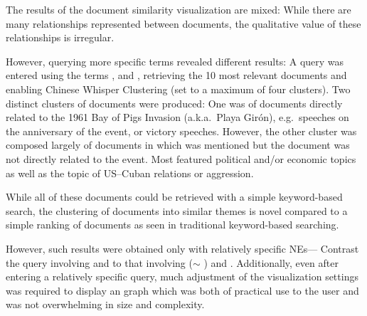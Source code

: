 The results of the document similarity visualization are mixed: While there are many relationships represented between documents, the qualitative value of these relationships is irregular.

However, querying more specific terms revealed different results: A query was entered using the terms , and , retrieving the 10 most relevant documents and enabling Chinese Whisper Clustering (set to a maximum of four clusters). Two distinct clusters of documents were produced: One was of documents directly related to the 1961 Bay of Pigs Invasion (a.k.a.\ Playa Gir\'{o}n), e.g.\ speeches on the anniversary of the event, or victory speeches. However, the other cluster was composed largely of documents in which  was mentioned but the document was not directly related to the event. Most featured political and/or economic topics as well as the topic of US--Cuban relations or aggression.

While all of these documents could be retrieved with a simple keyword-based search, the clustering of documents into similar themes is novel compared to a simple ranking of documents as seen in traditional keyword-based searching.

However, such results were obtained only with relatively specific NEs--- Contrast the query involving  and  to that involving  ($\sim$ )  and . Additionally, even after entering a relatively specific query, much adjustment of the visualization settings was required to display an graph which was both of practical use to the user and was not overwhelming in size and complexity.
